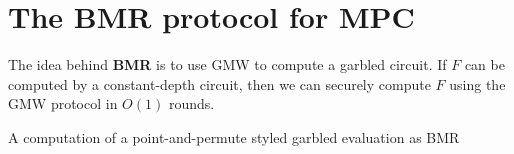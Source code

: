 \section{The BMR protocol for MPC}

\begin{prcl}
The idea behind \textbf{BMR} is to use GMW to compute a garbled circuit.
If $F$ can be computed by a constant-depth circuit, then we can securely compute $F$ using the GMW protocol in $O(1)$ rounds.

\end{prcl}

\begin{expl}
A computation of a point-and-permute styled garbled evaluation as BMR
\end{expl}

